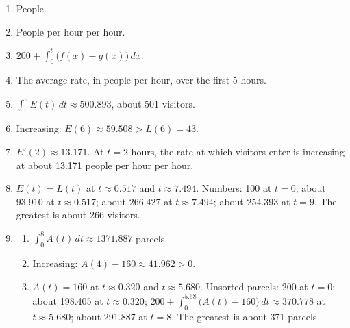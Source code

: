 \documentclass[11pt]{article}
\begin{document}
\newpage
\begin{solbox}
\begin{enumerate}[leftmargin=*,itemsep=4pt]
  \item People.
  \item People per hour per hour.
  \item $200+\displaystyle\int_{0}^{t}\big(f(x)-g(x)\big)\,dx$.
  \item The average rate, in people per hour, over the first 5 hours.
  \item $\displaystyle\int_{0}^{9}E(t)\,dt\approx500.893$, about 501 visitors.
  \item Increasing: $E(6)\approx59.508>L(6)=43$.
  \item $E'(2)\approx13.171$. At $t=2$ hours, the rate at which visitors enter is increasing at about 13.171 people per hour per hour.
  \item $E(t)=L(t)$ at $t\approx0.517$ and $t\approx7.494$. Numbers: 100 at $t=0$; about 93.910 at $t\approx0.517$; about 266.427 at $t\approx7.494$; about 254.393 at $t=9$. The greatest is about 266 visitors.
  \item \begin{enumerate}[label=(\alph*),leftmargin=*,itemsep=3pt]
    \item $\displaystyle\int_{0}^{8}A(t)\,dt\approx1371.887$ parcels.
    \item Increasing: $A(4)-160\approx41.962>0$.
    \item $A(t)=160$ at $t\approx0.320$ and $t\approx5.680$. Unsorted parcels: 200 at $t=0$; about 198.405 at $t\approx0.320$; $200+\displaystyle\int_{0}^{5.68}\big(A(t)-160\big)\,dt\approx370.778$ at $t\approx5.680$; about 291.887 at $t=8$. The greatest is about 371 parcels.
  \end{enumerate}
\end{enumerate}
\end{solbox}
\end{document}
